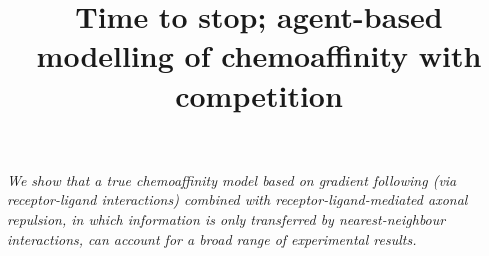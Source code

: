 \documentclass[11pt, a4paper]{article}
\title {
Time to stop; agent-based modelling of chemoaffinity with competition
}
\date{} %
\author{\Authors}
\begin{document}
\maketitle

\emph{We show that a true chemoaffinity model based on gradient following (via receptor-ligand interactions) combined with receptor-ligand-mediated axonal repulsion, in which information is only transferred by nearest-neighbour interactions, can account for a broad range of experimental results.}



\end{document}
